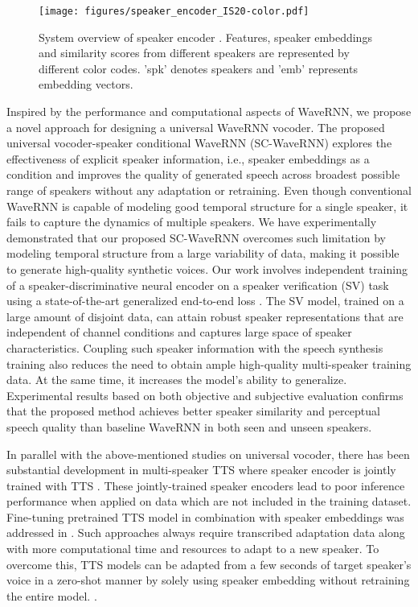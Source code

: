 \documentclass[a4paper]{article}
\begin{document}
\begin{figure*}[t!]
  \begin{center}
    \texttt{[image: figures/speaker\_encoder\_IS20-color.pdf]}
  \end{center}
  \vspace{-7mm}
  \caption{System overview of speaker encoder \cite{wan2018generalized}. Features, speaker embeddings and similarity scores from different speakers are represented by different color codes. 'spk' denotes speakers and 'emb' represents embedding vectors.}
  \vspace{-6mm}
  \label{spk-encode}
\end{figure*}

Inspired by the performance and computational aspects of WaveRNN, we propose a novel approach for designing a universal WaveRNN vocoder. The proposed universal vocoder-speaker conditional WaveRNN (SC-WaveRNN) explores the effectiveness of explicit speaker information, i.e., speaker embeddings as a condition and improves the quality of generated speech across broadest possible range of speakers without any adaptation or retraining. Even though conventional WaveRNN is capable of modeling good temporal structure for a single speaker, it fails to capture the dynamics of multiple speakers. We have experimentally demonstrated that our proposed SC-WaveRNN overcomes such limitation by modeling temporal structure from a large variability of data, making it possible to generate high-quality synthetic voices. Our work involves independent training of a speaker-discriminative neural encoder on a speaker verification (SV) task using a state-of-the-art generalized end-to-end loss \cite{wan2018generalized}. The SV model, trained on a large amount of disjoint data, can attain robust speaker representations that are independent of channel conditions and captures large space of speaker characteristics. Coupling such speaker information with the speech synthesis training also reduces the need to obtain ample high-quality multi-speaker training data. At the same time, it increases the model's ability to generalize. Experimental results based on both objective and subjective evaluation confirms that the proposed method achieves better speaker similarity and perceptual speech quality than baseline WaveRNN in both seen and unseen speakers.

In parallel with the above-mentioned studies on universal vocoder, there has been substantial development in multi-speaker TTS where speaker encoder is jointly trained with TTS \cite{chen2018sample, park2019multi}. These jointly-trained speaker encoders lead to poor inference performance when applied on data which are not included in the training dataset. Fine-tuning pretrained TTS model in combination with speaker embeddings was addressed in \cite{deng2018modeling, hu2019neural, arik2018neural}. Such approaches always require transcribed adaptation data along with more computational time and resources to adapt to a new speaker. To overcome this, TTS models can be adapted from a few seconds of target speaker’s voice in a zero-shot manner by solely using speaker embedding without retraining the entire model. \cite{jia2018transfer,chen2019cross,cooper2019zero}.
\end{document}
